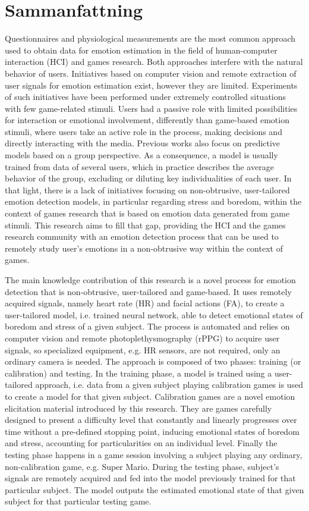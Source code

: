 \chapter*{Sammanfattning}

Questionnaires and physiological measurements are the most common approach used to obtain data for emotion estimation in the field of human-computer interaction (HCI) and games research. Both approaches interfere with the natural behavior of users. Initiatives based on computer vision and remote extraction of user signals for emotion estimation exist, however they are limited. Experiments of such initiatives have been performed under extremely controlled situations with few game-related stimuli. Users had a passive role with limited possibilities for interaction or emotional involvement, differently than game-based emotion stimuli, where users take an active role in the process, making decisions and directly interacting with the media. Previous works also focus on predictive models based on a group perspective. As a consequence, a model is usually trained from data of several users, which in practice describes the average behavior of the group, excluding or diluting key individualities of each user. In that light, there is a lack of initiatives focusing on non-obtrusive, user-tailored emotion detection models, in particular regarding stress and boredom, within the context of games research that is based on emotion data generated from game stimuli. This research aims to fill that gap, providing the HCI and the games research community with an emotion detection process that can be used to remotely study user's emotions in a non-obtrusive way within the context of games.

The main knowledge contribution of this research is a novel process for emotion detection that is non-obtrusive, user-tailored and game-based. It uses remotely acquired signals, namely heart rate (HR) and facial actions (FA), to create a user-tailored model, i.e. trained neural network, able to detect emotional states of boredom and stress of a given subject. The process is automated and relies on computer vision and remote photoplethysmography (rPPG) to acquire user signals, so specialized equipment, e.g. HR sensors, are not required, only an ordinary camera is needed. The approach is composed of two phases: training (or calibration) and testing. In the training phase, a model is trained using a user-tailored approach, i.e. data from a given subject playing calibration games is used to create a model for that given subject. Calibration games are a novel emotion elicitation material introduced by this research. They are games carefully designed to present a difficulty level that constantly and linearly progresses over time without a pre-defined stopping point, inducing emotional states of boredom and stress, accounting for particularities on an individual level. Finally the testing phase happens in a game session involving a subject playing any ordinary, non-calibration game, e.g. Super Mario. During the testing phase, subject's signals are remotely acquired and fed into the model previously trained for that particular subject. The model outputs the estimated emotional state of that given subject for that particular testing game.

